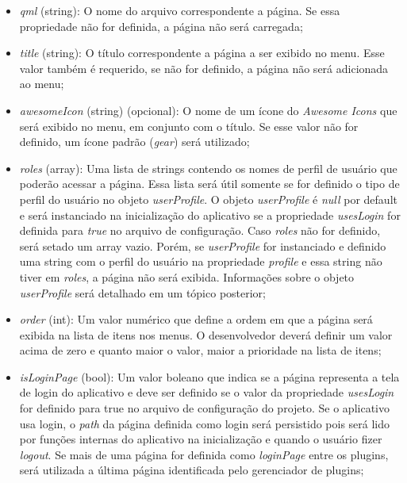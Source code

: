 \begin{itemize}
	\item \textit{qml} (string): O nome do arquivo correspondente a página. Se essa propriedade não for definida, a página não será carregada;

	\item \textit{title} (string): O título correspondente a página a ser exibido no menu. Esse valor também é requerido, se não for definido, a página não será adicionada ao menu;

	\item \textit{awesomeIcon} (string) (opcional): O nome de um ícone do \textit{Awesome Icons} que será exibido no menu, em conjunto com o título. Se esse valor não for definido, um ícone padrão (\textit{gear}) será utilizado;

	\item \textit{roles} (array): Uma lista de strings contendo os nomes de perfil de usuário que poderão acessar a página. Essa lista será útil somente se for definido o tipo de perfil do usuário no objeto \textit{userProfile}. O objeto \textit{userProfile} é \textit{null} por default e será instanciado na inicialização do aplicativo se a propriedade \textit{usesLogin} for definida para \textit{true} no arquivo de configuração. Caso \textit{roles} não for definido, será setado um array vazio. Porém, se \textit{userProfile} for instanciado e definido uma string com o perfil do usuário na propriedade \textit{profile} e essa string não tiver em \textit{roles}, a página não será exibida. Informações sobre o objeto \textit{userProfile} será detalhado em um tópico posterior;

	\item \textit{order} (int): Um valor numérico que define a ordem em que a página será exibida na lista de itens nos menus. O desenvolvedor deverá definir um valor acima de zero e quanto maior o valor, maior a prioridade na lista de itens;

	\item \textit{isLoginPage} (bool): Um valor boleano que indica se a página representa a tela de login do aplicativo e deve ser definido se o valor da propriedade \textit{usesLogin} for definido para true no arquivo de configuração do projeto. Se o aplicativo usa login, o \textit{path} da página definida como login será persistido pois será lido por funções internas do aplicativo na inicialização e quando o usuário fizer \textit{logout}. Se mais de uma página for definida como \textit{loginPage} entre os plugins, será utilizada a última página identificada pelo gerenciador de plugins;


\end{itemize}

